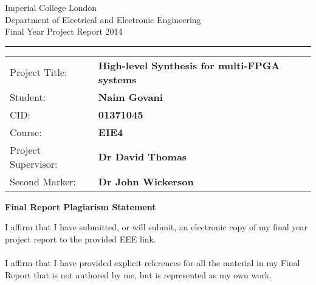 \documentclass[a4paper, twoside]{report}
\begin{document}
    \begin{titlepage}
        \setlength{\parindent}{0pt}
        \setlength{\parskip}{0pt}

        {
                        \Large
                        \raggedright
                        Imperial College London\\[17pt]
                        Department of Electrical and Electronic Engineering\\[17pt]
                        Final Year Project Report 2014\\[17pt]

        }

        \rule{\columnwidth}{3pt}
        \vfill
        \centering
        \vfill
        \setlength{\tabcolsep}{0pt}

        \begin{tabular}{p{40mm}p{\dimexpr\columnwidth-40mm}}
                        Project Title: & \textbf{High-level Synthesis for multi-FPGA systems} \\[12pt]
                        Student: & \textbf{Naim Govani} \\[12pt]
                        CID: & \textbf{01371045} \\[12pt]
                        Course: & \textbf{EIE4} \\[12pt]
                        Project Supervisor: & \textbf{Dr David Thomas} \\[12pt]
                        Second Marker: & \textbf{Dr John Wickerson} \\
        \end{tabular}
    \end{titlepage}

    \begin{center}
        \textbf{\huge Final Report Plagiarism Statement }
    \end{center}

    \noindent I affirm that I have submitted, or will submit, an electronic copy of my final year project report to the provided EEE link. \\ \\
    I affirm that I have provided explicit references for all the material in my Final Report that is not authored by me, but is represented as my own work.
    \newpage
    
    \setlength{\parskip}{4pt}
    \setlength{\parindent}{4pt}
\end{document}

